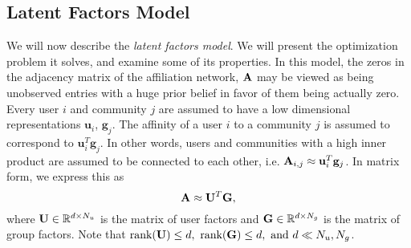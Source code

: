 \subsection{Latent Factors Model}
\label{Latent Factors Model}
We will now describe the \textit{latent factors model}. We will present the optimization problem it solves, and examine some of its properties. In this model, the zeros in the adjacency matrix of the affiliation network, $\mathbf{A}$ may be viewed as being unobserved entries with a huge prior belief in favor of them being actually zero. Every user $i$ and community $j$ are assumed to have a low dimensional representations $\mathbf{u}_i$, $\mathbf{g}_j$. The affinity of a user $i$ to a community $j$ is assumed to correspond to $\mathbf{u}_i^{T} \mathbf{g}_j$. In other words, users and communities with a high inner product are assumed to be connected to each other, i.e. $\mathbf{A}_{i, j} \approx \mathbf{u}_i^T \mathbf{g}_j$.
In matrix form, we express this as
\begin{equation}
 \label{e:lfm}
\mathbf{A} \approx \mathbf{U}^T \mathbf{G},
\end{equation}
where $\mathbf{U} \in \mathbb{R}^{d \times N_u}$ is the matrix of user factors and $\mathbf{G} \in \mathbb{R}^{d \times N_g}$ is the matrix of group factors. Note that $\text{rank}(\mathbf{U}) \leq d,\ \text{rank}(\mathbf{G}) \leq d,\text{ and } d \ll N_u, N_g$.

